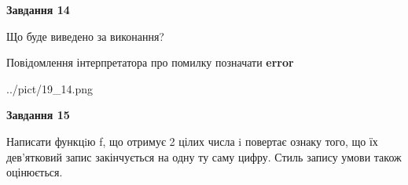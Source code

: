 \documentclass[11pt, ukrainian]{article}
\begin{document}
{\begin {large}
{\begin {center}\textbf{Завдання 14}\end {center}}\par
Що буде виведено за виконання? \par
Повідомлення інтерпретатора про помилку позначати \textbf{error}

\begin{center}
	{../pict/19_14.png}
\end{center}
\newpage

{\begin {center}\textbf{Завдання 15}\end {center}}\par

Написати функцiю f, що отримує 2 цілих числа i повертає ознаку того, що їх дев'ятковий запис закінчується на одну ту саму цифру. Стиль запису умови також оцінюється.\par
\newpage

\end {large}}
\end{document}
